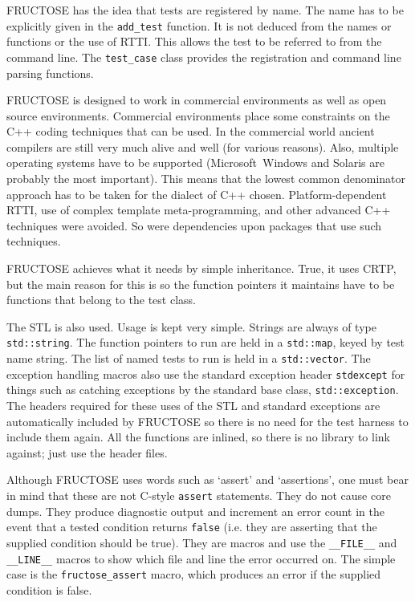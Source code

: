 \documentclass{book}
\begin{document}
FRUCTOSE has the idea that tests are registered by name.
The name has to be explicitly given in the {\tt add\_test} function.
It is not deduced from the names or functions or the use of RTTI.
This allows the test to be referred to from the command line.
The {\tt test\_case} class provides the registration and
command line parsing functions.


FRUCTOSE is designed to work in commercial environments as well as open source
environments. Commercial environments place some constraints on the C++ coding
techniques that can be used. In the commercial world ancient compilers are
still very much alive and well (for various reasons). Also, multiple operating
systems have to be supported (Microsoft~Windows and Solaris are probably the
most important). This means that the lowest common denominator approach has to
be taken for the dialect of C++ chosen. Platform-dependent RTTI, use of 
complex template meta-programming, and other advanced C++ techniques were
avoided. So were dependencies upon packages that use such techniques.

FRUCTOSE achieves what it needs by simple inheritance.
True, it uses CRTP, but the main reason for this is so the function pointers
it maintains have to be  functions that belong to the test class.

The STL is also used. Usage is kept very simple. Strings are always of type
{\tt std::string}. The function pointers to run are held in a {\tt std::map},
keyed by test name string.
The list of named tests to run is held in a {\tt std::vector}.
The exception handling macros also use the standard exception
header {\tt stdexcept} for things such as catching exceptions
by the standard base class,\hfil\break
{\tt std::exception}.
The headers required for these uses of the STL and standard exceptions
are automatically included by FRUCTOSE so there is no need for the
test harness to include them again.
All the functions are inlined, so there is no library to link
against; just use the header files.



Although FRUCTOSE uses words such as `assert' and `assertions',
one must bear in mind that these are not C-style {\tt assert}
statements. They do not cause core dumps. They produce diagnostic
output and increment an error count in the event that a tested
condition returns {\tt false} (i.e. they are asserting
that the supplied condition should be true). 
They are macros and use the
{\tt \_\_FILE\_\_} and {\tt \_\_LINE\_\_}
macros to show which file and line the error occurred on.
The simple case is the {\tt fructose\_assert} macro,
which produces an error if the supplied condition is false.
\end{document}
